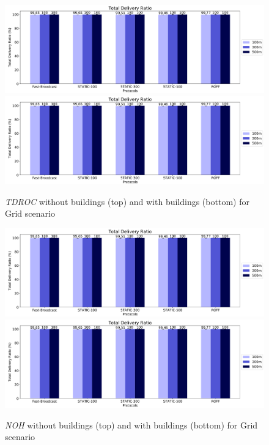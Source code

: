 		\begin{figure}[H]
			\centering
			\includegraphics[width=1.0\textwidth]{immagini/grid-300/b0/tdroc}
			\includegraphics[width=1.0\textwidth]{immagini/grid-300/b1/tdroc}
			\caption{\textit{TDROC} without buildings (top) and with buildings (bottom) for Grid scenario}
			\label{fig:grid-tdroc}
		\end{figure}
	
		\begin{figure}[H]
			\centering
			\includegraphics[width=1.0\textwidth]{immagini/grid-300/b0/noh}
			\includegraphics[width=1.0\textwidth]{immagini/grid-300/b1/noh}
			\caption{\textit{NOH} without buildings (top) and with buildings (bottom) for Grid scenario}
			\label{fig:grid-noh}
		\end{figure}
	

